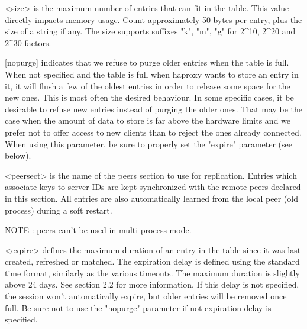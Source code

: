     <size>     is the maximum number of entries that can fit in the table. This
               value directly impacts memory usage. Count approximately
               50 bytes per entry, plus the size of a string if any. The size
               supports suffixes "k", "m", "g" for 2^10, 2^20 and 2^30 factors.

    [nopurge]  indicates that we refuse to purge older entries when the table
               is full. When not specified and the table is full when haproxy
               wants to store an entry in it, it will flush a few of the oldest
               entries in order to release some space for the new ones. This is
               most often the desired behaviour. In some specific cases, it
               be desirable to refuse new entries instead of purging the older
               ones. That may be the case when the amount of data to store is
               far above the hardware limits and we prefer not to offer access
               to new clients than to reject the ones already connected. When
               using this parameter, be sure to properly set the "expire"
               parameter (see below).

    <peersect> is the name of the peers section to use for replication. Entries
               which associate keys to server IDs are kept synchronized with
               the remote peers declared in this section. All entries are also
               automatically learned from the local peer (old process) during a
               soft restart.

               NOTE : peers can't be used in multi-process mode.

    <expire>   defines the maximum duration of an entry in the table since it
               was last created, refreshed or matched. The expiration delay is
               defined using the standard time format, similarly as the various
               timeouts. The maximum duration is slightly above 24 days. See
               section 2.2 for more information. If this delay is not specified,
               the session won't automatically expire, but older entries will
               be removed once full. Be sure not to use the "nopurge" parameter
               if not expiration delay is specified.


